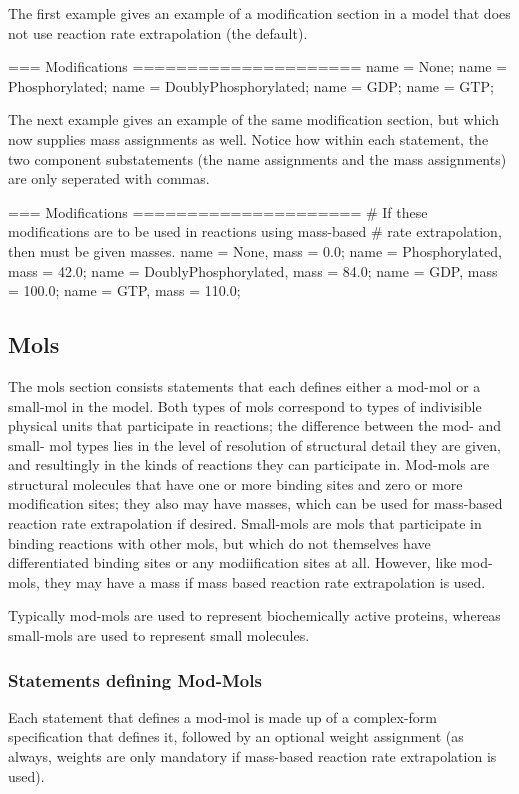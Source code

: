 The first example gives an example of a modification section in a
model that does not use reaction rate extrapolation (the default).

\begin{ExampleMZR}
=== Modifications =====================
     name = None;
     name = Phosphorylated;
     name = DoublyPhosphorylated;
     name = GDP;
     name = GTP;
\end{ExampleMZR}

The next example gives an example of the same modification section,
but which now supplies mass assignments as well.  Notice how within
each statement, the two component substatements (the name assignments
and the mass assignments) are only seperated with commas.

\begin{ExampleMZR}
=== Modifications =====================
     # If these modifications are to be used in reactions using mass-based
     # rate extrapolation, then must be given masses.
     name = None, mass = 0.0;
     name = Phosphorylated, mass = 42.0;
     name = DoublyPhosphorylated, mass = 84.0;
     name = GDP, mass = 100.0;
     name = GTP, mass = 110.0;
\end{ExampleMZR}


\subsection{Mols}
The mols section consists statements that each defines either a
mod-mol or a small-mol in the model.  Both types of mols correspond to
types of indivisible physical units that participate in reactions; the
difference between the mod- and small- mol types lies in the level of
resolution of structural detail they are given, and resultingly in the
kinds of reactions they can participate in. Mod-mols are structural
molecules that have one or more binding sites and zero or more
modification sites; they also may have masses, which can be used for
mass-based reaction rate extrapolation if desired.  Small-mols are
mols that participate in binding reactions with other mols, but which
do not themselves have differentiated binding sites or any
modiification sites at all. However, like mod-mols, they may have
a mass if mass based reaction rate extrapolation is used.

Typically mod-mols are used to represent biochemically active
proteins, whereas small-mols are used to represent small molecules.  

\subsubsection{Statements defining Mod-Mols}
Each statement that defines a mod-mol is made up of a complex-form
specification that defines it, followed by an optional weight
assignment (as always, weights are only mandatory if mass-based
reaction rate extrapolation is used).

